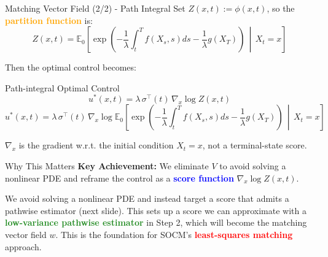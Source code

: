 \documentclass[aspectratio=169,xcolor=dvipsnames]{beamer}
\begin{document}
\begin{frame}[allowframebreaks]{Matching Vector Field (2/2) - Path Integral}
    Set $Z(x,t) := \phi(x,t)$, so the \textcolor{orange}{\textbf{partition function}} is:
    $$Z(x,t) = \mathbb{E}_0\left[\exp\left(-\frac{1}{\lambda}\int_t^T f(X_s,s) ds - \frac{1}{\lambda} g(X_T)\right) \,\middle|\, X_t = x\right]$$
    
    Then the optimal control becomes:
    
    \begin{alertblock}{Path-integral Optimal Control}
        $$u^*(x,t) = \lambda \, \sigma^\top(t) \, \nabla_x \log Z(x,t)$$
        $$u^*(x,t) = \lambda \, \sigma^\top(t) \, \nabla_x \log \mathbb{E}_0\left[\exp\left(-\frac{1}{\lambda}\int_t^T f(X_s,s) ds - \frac{1}{\lambda} g(X_T)\right) \,\middle|\, X_t = x\right]$$

        \footnotesize{$\nabla_x$ is the gradient w.r.t. the initial condition $X_t = x$, not a terminal-state score.}
    \end{alertblock}
    
    \vspace{0.8cm}
    
    \begin{block}{Why This Matters}
        \textbf{Key Achievement:} We eliminate $V$ to avoid solving a nonlinear PDE and reframe the control as a \textcolor{blue}{\textbf{score function}} $\nabla_x \log Z(x,t)$.
        
        \vspace{0.3cm}
        
        We avoid solving a nonlinear PDE and instead target a score that admits a pathwise estimator (next slide). This sets up a score we can approximate with a \textcolor{ForestGreen}{\textbf{low-variance pathwise estimator}} in Step 2, which will become the matching vector field $w$. This is the foundation for SOCM's \textcolor{red}{\textbf{least-squares matching}} approach.
    \end{block}
    
    \framebreak
\end{frame}
\end{document}
